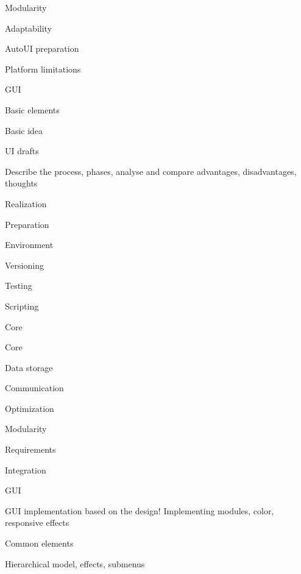 \secc Modularity


\secc Adaptability


\secc AutoUI preparation


\secc Platform limitations


\sec GUI


\secc Basic elements

Basic idea

\secc UI drafts

Describe the process, phases, analyse and compare advantages, disadvantages, thoughts

\chap Realization


\sec Preparation


\secc Environment


\secc Versioning


\secc Testing


\secc Scripting


\sec Core


\secc Core


\secc Data storage


\secc Communication


\secc Optimization


\sec Modularity


\secc Requirements


\secc Integration


\sec GUI

GUI implementation based on the design! Implementing modules, color, responsive effects

\secc Common elements

Hierarchical model, effects, submenus

